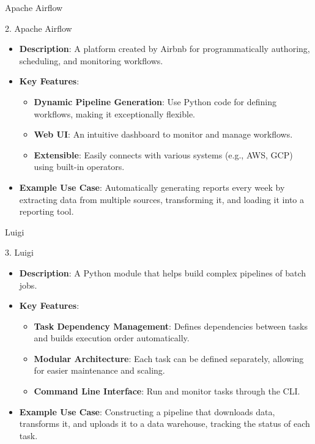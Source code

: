 \documentclass[aspectratio=169]{beamer}
\begin{document}
\begin{frame}[fragile]{Apache Airflow}
    \begin{block}{2. Apache Airflow}
        \begin{itemize}
            \item \textbf{Description}: A platform created by Airbnb for programmatically authoring, scheduling, and monitoring workflows.
            \item \textbf{Key Features}:
                \begin{itemize}
                    \item \textbf{Dynamic Pipeline Generation}: Use Python code for defining workflows, making it exceptionally flexible.
                    \item \textbf{Web UI}: An intuitive dashboard to monitor and manage workflows.
                    \item \textbf{Extensible}: Easily connects with various systems (e.g., AWS, GCP) using built-in operators.
                \end{itemize}
            \item \textbf{Example Use Case}: Automatically generating reports every week by extracting data from multiple sources, transforming it, and loading it into a reporting tool.
        \end{itemize}
    \end{block}
\end{frame}

\begin{frame}[fragile]{Luigi}
    \begin{block}{3. Luigi}
        \begin{itemize}
            \item \textbf{Description}: A Python module that helps build complex pipelines of batch jobs.
            \item \textbf{Key Features}:
                \begin{itemize}
                    \item \textbf{Task Dependency Management}: Defines dependencies between tasks and builds execution order automatically.
                    \item \textbf{Modular Architecture}: Each task can be defined separately, allowing for easier maintenance and scaling.
                    \item \textbf{Command Line Interface}: Run and monitor tasks through the CLI.
                \end{itemize}
            \item \textbf{Example Use Case}: Constructing a pipeline that downloads data, transforms it, and uploads it to a data warehouse, tracking the status of each task.
        \end{itemize}
    \end{block}
\end{frame}
\end{document}
